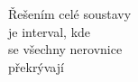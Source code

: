 \documentclass[preview]{standalone}
\begin{document}
\begin{center}
Řešením celé soustavy\\je interval, kde \\se všechny nerovnice\\ překrývají
\end{center}
\end{document}
